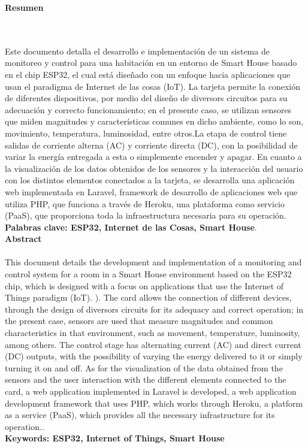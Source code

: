 \newpage
\thispagestyle{empty} \textbf{}\normalsize
\textbf{\LARGE Resumen}
\markboth{}{}
\\\\
 Este documento detalla el desarrollo e implementación de un sistema de monitoreo y control para una habitación en un entorno de Smart House basado en el chip ESP32, el cual está diseñado con un enfoque hacia aplicaciones que usan el paradigma de Internet de las cosas (IoT). La tarjeta permite la conexión de diferentes dispositivos, por medio del diseño de diversors circuitos para su adecuación y correcto funcionamiento; en el presente caso, se utilizan sensores que miden magnitudes y características comunes en dicho ambiente, como lo son, movimiento, temperatura, luminosidad, entre otros.La etapa de control tiene salidas de corriente alterna (AC) y corriente directa (DC), con la posibilidad de variar la energía entregada a esta o simplemente encender y apagar. En cuanto a la visualización de los datos obtenidos de los sensores y la interacción del usuario con los distintos elementos conectados a la tarjeta, se desarrolla una aplicación web implementada en Laravel, framework de desarrollo de aplicaciones web que utiliza PHP, que funciona a través de Heroku, una plataforma como servicio (PaaS), que proporciona toda la infraestructura necesaria para su operación.\\
 
\textbf{\small Palabras clave: ESP32, Internet de las Cosas, Smart House}.\\[1.0cm]

\textbf{\LARGE Abstract}\\\\
This document details the development and implementation of a monitoring and control system for a room in a Smart House environment based on the ESP32 chip, which is designed with a focus on applications that use the Internet of Things paradigm (IoT). ). The card allows the connection of different devices, through the design of diversors circuits for its adequacy and correct operation; in the present case, sensors are used that measure magnitudes and common characteristics in that environment, such as movement, temperature, luminosity, among others. The control stage has alternating current (AC) and direct current (DC) outputs, with the possibility of varying the energy delivered to it or simply turning it on and off. As for the visualization of the data obtained from the sensors and the user interaction with the different elements connected to the card, a web application implemented in Laravel is developed, a web application development framework that uses PHP, which works through Heroku, a platform as a service (PaaS), which provides all the necessary infrastructure for its operation..\\

\textbf{\small Keywords: ESP32, Internet of Things, Smart House}
